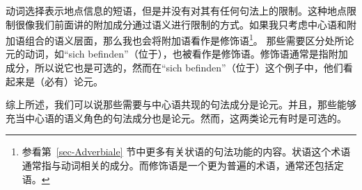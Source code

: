 %
%
动词选择表示地点信息的短语，但是并没有对其有任何句法上的限制。这种地点限制很像我们前面讲的附加成分通过语义进行限制的方式。如果我只考虑中心语和附加语组合的语义层面，那么我也会将附加语看作是修饰语\footnote{参看第~\ref{sec-Adverbiale} 节中更多有关状语的句法功能的内容。状语这个术语通常指与动词相关的成分。而修饰语是一个更为普遍的术语，通常还包括定语。}。
那些需要区分处所论元的动词，如“sich befinden”（位于），也被看作是修饰语。修饰语通常是指附加成分，所以说它也是可选的，然而在“sich befinden”（位于）这个例子中，他们看起来是（必有）论元。

综上所述，我们可以说那些需要与中心语共现的句法成分是论元。并且，那些能够充当中心语的语义角色的句法成分也是论元。然而，这两类论元有时是可选的。

